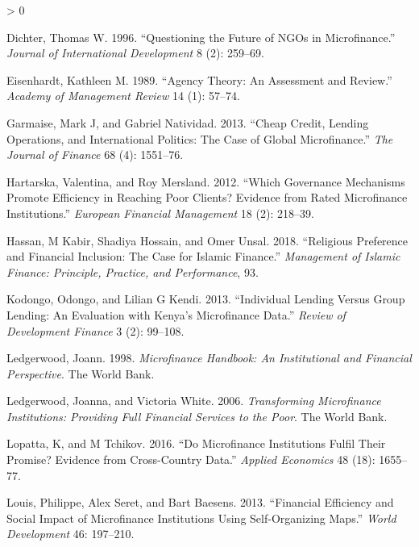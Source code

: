 \documentclass[
]{article}
\newlength{\cslhangindent}
\newenvironment{CSLReferences}[2] %
 {%
  \setlength{\parindent}{0pt}
  \ifodd #1 \everypar{\setlength{\hangindent}{\cslhangindent}}\ignorespaces\fi
  \ifnum #2 > 0
  \setlength{\parskip}{#2\baselineskip}
  \fi
 }%
 {}
\begin{document}
\begin{CSLReferences}{1}{0}
\leavevmode\hypertarget{ref-dichter1996questioning}{}%
Dichter, Thomas W. 1996. {``Questioning the Future of NGOs in
Microfinance.''} \emph{Journal of International Development} 8 (2):
259--69.

\leavevmode\hypertarget{ref-eisenhardt1989agency}{}%
Eisenhardt, Kathleen M. 1989. {``Agency Theory: An Assessment and
Review.''} \emph{Academy of Management Review} 14 (1): 57--74.

\leavevmode\hypertarget{ref-garmaise2013cheap}{}%
Garmaise, Mark J, and Gabriel Natividad. 2013. {``Cheap Credit, Lending
Operations, and International Politics: The Case of Global
Microfinance.''} \emph{The Journal of Finance} 68 (4): 1551--76.

\leavevmode\hypertarget{ref-hartarska2012governance}{}%
Hartarska, Valentina, and Roy Mersland. 2012. {``Which Governance
Mechanisms Promote Efficiency in Reaching Poor Clients? Evidence from
Rated Microfinance Institutions.''} \emph{European Financial Management}
18 (2): 218--39.

\leavevmode\hypertarget{ref-hassan2018religious}{}%
Hassan, M Kabir, Shadiya Hossain, and Omer Unsal. 2018. {``Religious
Preference and Financial Inclusion: The Case for Islamic Finance.''}
\emph{Management of Islamic Finance: Principle, Practice, and
Performance}, 93.

\leavevmode\hypertarget{ref-kodongo2013individual}{}%
Kodongo, Odongo, and Lilian G Kendi. 2013. {``Individual Lending Versus
Group Lending: An Evaluation with Kenya's Microfinance Data.''}
\emph{Review of Development Finance} 3 (2): 99--108.

\leavevmode\hypertarget{ref-ledgerwood1998microfinance}{}%
Ledgerwood, Joann. 1998. \emph{Microfinance Handbook: An Institutional
and Financial Perspective}. The World Bank.

\leavevmode\hypertarget{ref-ledgerwood2006transforming}{}%
Ledgerwood, Joanna, and Victoria White. 2006. \emph{Transforming
Microfinance Institutions: Providing Full Financial Services to the
Poor}. The World Bank.

\leavevmode\hypertarget{ref-lopatta2016microfinance}{}%
Lopatta, K, and M Tchikov. 2016. {``Do Microfinance Institutions Fulfil
Their Promise? Evidence from Cross-Country Data.''} \emph{Applied
Economics} 48 (18): 1655--77.

\leavevmode\hypertarget{ref-louis2013financial}{}%
Louis, Philippe, Alex Seret, and Bart Baesens. 2013. {``Financial
Efficiency and Social Impact of Microfinance Institutions Using
Self-Organizing Maps.''} \emph{World Development} 46: 197--210.


\end{CSLReferences}
\end{document}
